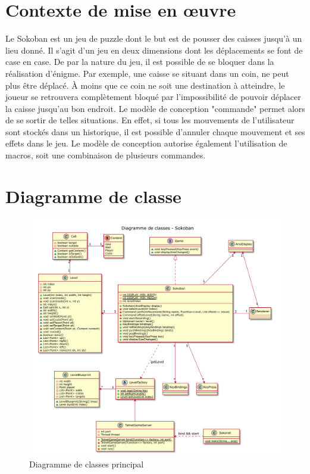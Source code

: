 \documentclass[french]{article}
\begin{document}
	\section{Contexte de mise en œuvre}
	Le Sokoban est un jeu de puzzle dont le but est de pousser des caisses jusqu'à un lieu donné. Il s'agit d'un jeu en deux dimensions dont les déplacements se font de case en case. De par la nature du jeu, il est possible de se bloquer dans la réalisation d'énigme. Par exemple, une caisse se situant dans un coin, ne peut plus être déplacé. À moins que ce coin ne soit une destination à atteindre, le joueur se retrouvera complètement bloqué par l'impossibilité de pouvoir déplacer la caisse jusqu'au bon endroit. Le modèle de conception "commande" permet alors de se sortir de telles situations. En effet, si tous les mouvements de l'utilisateur sont stockés dans un historique, il est possible d'annuler chaque mouvement et ses effets dans le jeu. Le modèle de conception autorise également l'utilisation de macros, soit une combinaison de plusieurs commandes.
	
	\section{Diagramme de classe}
	\begin{figure}[H]
		\centering
		\includegraphics[width=\textwidth]{sokoban}
		\caption{Diagramme de classes principal}
		\label{classDiagMain}
	\end{figure}
	
\end{document}
